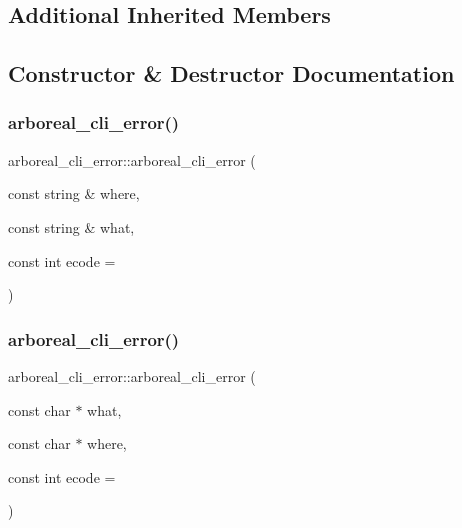 \subsection*{Additional Inherited Members}


\subsection{Constructor \& Destructor Documentation}
\mbox{\label{classarboreal__cli__error_a39291e6c997b531c712892b9623f938a}} 
\subsubsection{\texorpdfstring{arboreal\+\_\+cli\+\_\+error()}{arboreal\_cli\_error()}\hspace{0.1cm}{\footnotesize\ttfamily [1/4]}}
{\footnotesize\ttfamily arboreal\+\_\+cli\+\_\+error\+::arboreal\+\_\+cli\+\_\+error (\begin{DoxyParamCaption}\item[{const string \&}]{where,  }\item[{const string \&}]{what,  }\item[{const int}]{ecode = {} }\end{DoxyParamCaption})}

\mbox{\label{classarboreal__cli__error_adecf3ae0818fcdff4d375ef12ea1659e}} 
\subsubsection{\texorpdfstring{arboreal\+\_\+cli\+\_\+error()}{arboreal\_cli\_error()}\hspace{0.1cm}{\footnotesize\ttfamily [2/4]}}
{\footnotesize\ttfamily arboreal\+\_\+cli\+\_\+error\+::arboreal\+\_\+cli\+\_\+error (\begin{DoxyParamCaption}\item[{const char $\ast$}]{what,  }\item[{const char $\ast$}]{where,  }\item[{const int}]{ecode = {} }\end{DoxyParamCaption})}

